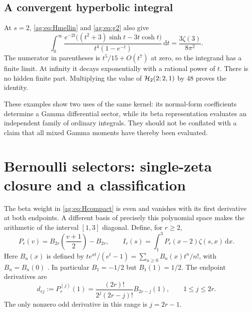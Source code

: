 \documentclass[11pt,letterpaper]{article}
\numberwithin{equation}{section}
\theoremstyle{definition}\newtheorem{definition}[theorem]{Definition}
\theoremstyle{remark}\newtheorem{remark}[theorem]{Remark}
\newcommand{\dd}{\,\mathrm d}\newcommand{\ii}{\mathrm i}
\begin{document}
\subsection{A convergent hyperbolic integral}
At $s=2$, \eqref{ag:eq:Hmellin} and \eqref{ag:eq:g2} also give
\begin{equation}\label{ag:eq:hyperbolic-integral}
 \boxed{
 \int_0^\infty
 \frac{e^{-2t}\bigl((t^2+3)\sinh t-3t\cosh t\bigr)}
      {t^4(1-e^{-t})}\dd t
 =\frac{3\zeta(3)}{8\pi^2}.}
\end{equation}
The numerator in parentheses is $t^5/15+O(t^7)$ at zero, so the
integrand has a finite limit. At infinity it decays exponentially
with a rational power of $t$. There is no hidden finite part.
Multiplying the value of $\mathcal H_2(2;2,1)$ by $48$ proves the identity.

These examples show two uses of the same kernel: its normal-form
coefficients determine a Gamma differential sector, while its beta
representation evaluates an independent family of ordinary integrals.
They should not be conflated with a claim that all mixed Gamma moments
have thereby been evaluated.



\section{Bernoulli selectors: single-zeta closure and a classification}
\label{ag:sec:bernoulli}

The beta weight in \eqref{ag:eq:Hcompact} is even and vanishes with its
first derivative at both endpoints. A different basis of precisely this
polynomial space makes the arithmetic of the interval $[1,3]$ diagonal.
Define, for $r\ge2$,
\begin{equation}\label{ag:eq:Bernoulli-weight}
 P_r(v)=B_{2r}\left(\frac{v+1}{2}\right)-B_{2r},\qquad
 I_r(s)=\int_1^3P_r(x-2)\zeta(s,x)\dd x.
\end{equation}
Here $B_n(x)$ is defined by
$te^{xt}/(e^t-1)=\sum_{n\ge0}B_n(x)t^n/n!$, with $B_n=B_n(0)$
\cite{DLMFBernoulli}. In particular $B_1=-1/2$ but $B_1(1)=1/2$.
The endpoint derivatives are
\begin{equation}\label{ag:eq:Bernoulli-d}
 d_{rj}:=P_r^{(j)}(1)
 =\frac{(2r)!}{2^j(2r-j)!}B_{2r-j}(1),\qquad 1\le j\le2r.
\end{equation}
The only nonzero odd derivative in this range is $j=2r-1$.
\end{document}
